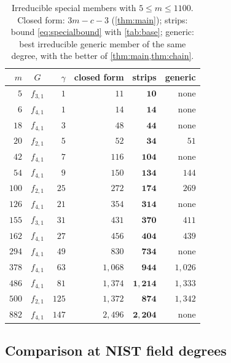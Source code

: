 \documentclass{ieeeaccess}
\theoremstyle{plain}
\theoremstyle{definition}
\begin{document}
\begin{table}[t]
\centering\small
\caption{Irreducible special members with $5\le m\le1100$. Closed form:
$3m-c-3$ (\cref{thm:main}); strips: bound \eqref{eq:specialbound} with
\cref{tab:base}; generic: best irreducible generic member of the same degree,
with the better of \cref{thm:main,thm:chain}.}
\label{tab:specirr}
\setlength{\tabcolsep}{3.5pt}
\begin{tabular}{@{}r c r r r r@{}}
\toprule
$m$ & $G$ & $\gamma$ & closed form & strips & generic\\
\midrule
$5$   & $f_{3,1}$ & $1$   & $11$      & $\mathbf{10}$      & none\\
$6$   & $f_{4,1}$ & $1$   & $14$      & $\mathbf{14}$      & none\\
$18$  & $f_{4,1}$ & $3$   & $48$      & $\mathbf{44}$      & none\\
$20$  & $f_{2,1}$ & $5$   & $52$      & $\mathbf{34}$      & $51$\\
$42$  & $f_{4,1}$ & $7$   & $116$     & $\mathbf{104}$     & none\\
$54$  & $f_{4,1}$ & $9$   & $150$     & $\mathbf{134}$     & $144$\\
$100$ & $f_{2,1}$ & $25$  & $272$     & $\mathbf{174}$     & $269$\\
$126$ & $f_{4,1}$ & $21$  & $354$     & $\mathbf{314}$     & none\\
$155$ & $f_{3,1}$ & $31$  & $431$     & $\mathbf{370}$     & $411$\\
$162$ & $f_{4,1}$ & $27$  & $456$     & $\mathbf{404}$     & $439$\\
$294$ & $f_{4,1}$ & $49$  & $830$     & $\mathbf{734}$     & none\\
$378$ & $f_{4,1}$ & $63$  & $1,068$  & $\mathbf{944}$    & $1,026$\\
$486$ & $f_{4,1}$ & $81$  & $1,374$  & $\mathbf{1,214}$  & $1,333$\\
$500$ & $f_{2,1}$ & $125$ & $1,372$  & $\mathbf{874}$     & $1,342$\\
$882$ & $f_{4,1}$ & $147$ & $2,496$  & $\mathbf{2,204}$  & none\\
\bottomrule
\end{tabular}
\end{table}

\subsection{Comparison at NIST field degrees}
\end{document}
